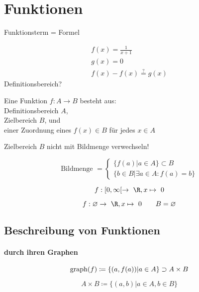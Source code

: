 \chapter{Funktionen}
Funktionsterm = Formel \\
\begin{bsp*}
	\begin{gather*}
		f(x) = \frac{1}{x+1} \\
		g(x) = 0 \\
		f(x) - f(x) \overset{?}{=} g(x)
	\end{gather*}
	Definitionsbereich?
\end{bsp*}\marginpar{$[a,b) = [a,b[$ halb-offenes Intervall\\\\ $\mapsto$ wird abgebildet auf\\\\ $\{\} = \emptyset$}
\begin{def*}[note = Funktion , index = Funktion]
	Eine Funktion $f: A \rightarrow B$ besteht aus: \\
	\qquad Definitionsbereich $A$, \\
	\qquad Zielbereich $B$, und \\
	\qquad einer Zuordnung eines $f(x) \in B$ für jedes $x \in A$
\end{def*}
\begin{bem}
	Zielbereich $B$ nicht mit Bildmenge verwechseln! \\
	\begin{def*}[note = Bildmenge , index = Bildmenge]
		\[
			\text{Bildmenge } = \begin{cases}
				\{ f(a)  | a \in A \} \subset B \\
				\{ b \in B | \exists a \in A : f(a) = b \}
			\end{cases}
		\]
	\end{def*}
\end{bem}
\begin{bsp*}
	\[ f: [0,\infty [ \rightarrow \R , x \mapsto 0 \]
\end{bsp*}
\begin{bsp*}
	\[ f: \emptyset \rightarrow \R , x \mapsto 0 \qquad B = \varnothing \]
\end{bsp*}

\section{Beschreibung von Funktionen}
\subsubsection{durch ihren Graphen}
\begin{def*}[note = Graph , index = Graph]
	\[ \operatorname{graph}(f) \coloneqq \{ ( a , f(a) ) | a \in A \} \supset A \times B \]
\end{def*}
\begin{def*}[note = Kreuzmenge , index = Kreuzmenge]
	\[ A \times B \coloneqq \{ ( a , b ) | a \in A , b \in B \} \]
\end{def*}

